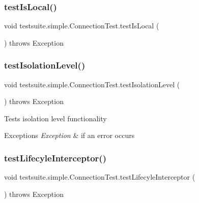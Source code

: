 \subsubsection{\texorpdfstring{test\+Is\+Local()}{testIsLocal()}}
{\footnotesize\ttfamily void testsuite.\+simple.\+Connection\+Test.\+test\+Is\+Local (\begin{DoxyParamCaption}{ }\end{DoxyParamCaption}) throws Exception}

\mbox{\label{classtestsuite_1_1simple_1_1_connection_test_a021e6d2e50117ac6af546f9f340e2127}} 
\subsubsection{\texorpdfstring{test\+Isolation\+Level()}{testIsolationLevel()}}
{\footnotesize\ttfamily void testsuite.\+simple.\+Connection\+Test.\+test\+Isolation\+Level (\begin{DoxyParamCaption}{ }\end{DoxyParamCaption}) throws Exception}

Tests isolation level functionality


\begin{DoxyExceptions}{Exceptions}
{\em Exception} & if an error occurs \\
\hline
\end{DoxyExceptions}
\mbox{\label{classtestsuite_1_1simple_1_1_connection_test_ade9f97f7bb0875ac302b464bf8a00e40}} 
\subsubsection{\texorpdfstring{test\+Lifecyle\+Interceptor()}{testLifecyleInterceptor()}}
{\footnotesize\ttfamily void testsuite.\+simple.\+Connection\+Test.\+test\+Lifecyle\+Interceptor (\begin{DoxyParamCaption}{ }\end{DoxyParamCaption}) throws Exception}

